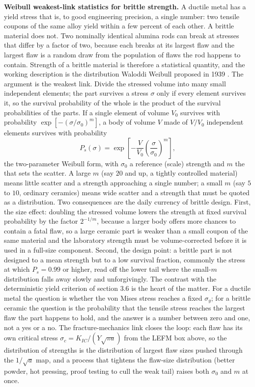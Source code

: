 \begin{mastery}
\textbf{Weibull weakest-link statistics for brittle strength.} A ductile
metal has a yield stress that is, to good engineering precision, a single
number: two tensile coupons of the same alloy yield within a few percent
of each other. A brittle material does not. Two nominally identical
alumina rods can break at stresses that differ by a factor of two,
because each breaks at its largest flaw and the largest flaw is a random
draw from the population of flaws the rod happens to contain. Strength of
a brittle material is therefore a statistical quantity, and the working
description is the distribution Waloddi Weibull proposed in 1939
\cite{paper:weibull1939}. The argument is the weakest link. Divide the
stressed volume into many small independent elements; the part survives a
stress $\sigma$ only if every element survives it, so the survival
probability of the whole is the product of the survival probabilities of
the parts. If a single element of volume $V_0$ survives with probability
$\exp[-(\sigma/\sigma_0)^m]$, a body of volume $V$ made of $V/V_0$
independent elements survives with probability
\[
P_s(\sigma) = \exp\!\left[-\frac{V}{V_0}\left(\frac{\sigma}{\sigma_0}
\right)^{m}\right],
\]
the two-parameter Weibull form, with $\sigma_0$ a reference (scale)
strength and $m$ the  that sets the scatter. A
large $m$ (say $20$ and up, a tightly controlled material) means little
scatter and a strength approaching a single number; a small $m$ (say $5$
to $10$, ordinary ceramics) means wide scatter and a strength that must
be quoted as a distribution. Two consequences are the daily currency of
brittle design. First, the size effect: doubling the stressed volume
lowers the strength at fixed survival probability by the factor
$2^{-1/m}$, because a larger body offers more chances to contain a fatal
flaw, so a large ceramic part is weaker than a small coupon of the same
material and the laboratory strength must be volume-corrected before it
is used in a full-size component. Second, the design point: a brittle
part is not designed to a mean strength but to a low survival fraction,
commonly the stress at which $P_s = 0.99$ or higher, read off the lower
tail where the small-$m$ distribution falls away slowly and unforgivingly.
The contrast with the deterministic yield criterion of section 3.6 is the
heart of the matter. For a ductile metal the question is whether the von
Mises stress reaches a fixed $\sigma_y$; for a brittle ceramic the
question is the probability that the tensile stress reaches the largest
flaw the part happens to hold, and the answer is a number between zero and
one, not a yes or a no. The fracture-mechanics link closes the loop: each
flaw has its own critical stress $\sigma_c = K_{IC}/(Y\sqrt{\pi a})$ from
the LEFM box above, so the distribution of strengths is the distribution
of largest flaw sizes pushed through the $1/\sqrt{a}$ map, and a process
that tightens the flaw-size distribution (better powder, hot pressing,
proof testing to cull the weak tail) raises both $\sigma_0$ and $m$ at
once.
\end{mastery}

